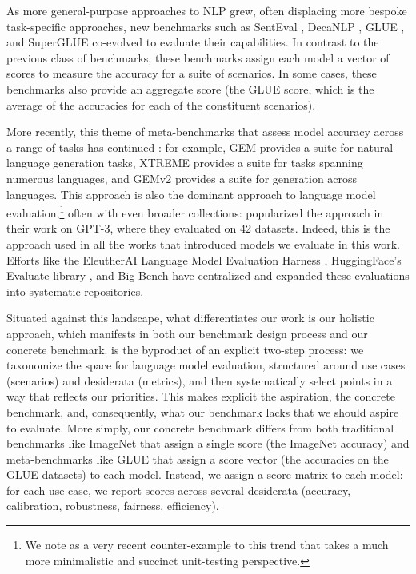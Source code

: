 As more general-purpose approaches to NLP grew, often displacing more bespoke task-specific approaches, new benchmarks such as SentEval \citep{conneau2018senteval}, DecaNLP \citep{mccann2018natural}, GLUE \citep{wang2019glue}, and SuperGLUE \citep{wang2019superglue} co-evolved to evaluate their capabilities.
In contrast to the previous class of benchmarks, these benchmarks assign each model a vector of scores to measure the accuracy for a suite of scenarios.
In some cases, these benchmarks also provide an aggregate score (\eg the GLUE score, which is the average of the accuracies for each of the constituent scenarios).

More recently, this theme of meta-benchmarks that assess model accuracy across a range of tasks has continued \citep[see][\S4.4.3]{bommasani2021opportunities}: for example, GEM \citep{gehrmann2021gem} provides a suite for natural language generation tasks, XTREME \citep{hu2020xtreme} provides a suite for tasks spanning numerous languages, and GEMv2 \citep{gehrmann2022gemv2} provides a suite for generation across languages. 
This approach is also the dominant approach to language model evaluation,\footnote{We note \citet{efrat2022lmentry} as a very recent counter-example to this trend that takes a much more minimalistic and succinct unit-testing perspective.}
 often with even broader collections: \citet{brown2020gpt3} popularized the approach in their work on GPT-3, where they evaluated on 42 datasets.
Indeed, this is the approach used in all the works that introduced models we evaluate in this work.
Efforts like the EleutherAI Language Model Evaluation Harness \citep{gao2021harness}, HuggingFace's Evaluate library \citep{werra2022evaluate}, and Big-Bench \citep{srivastava2022bigbench} have centralized and expanded these evaluations into systematic repositories.

Situated against this landscape, what differentiates our work is our holistic approach, which manifests in both our benchmark design process and our concrete benchmark.
\benchmarkname is the byproduct of an explicit two-step process: we taxonomize the space for language model evaluation, structured around use cases (scenarios) and desiderata (metrics), and then systematically select points in a way that reflects our priorities. 
This makes explicit the aspiration, the concrete benchmark, and, consequently, what our benchmark lacks that we should aspire to evaluate. 
More simply, our concrete benchmark differs from both traditional benchmarks like ImageNet that assign a single score (\ie the ImageNet accuracy) and meta-benchmarks like GLUE that assign a score vector (\ie the accuracies on the GLUE datasets) to each model.
Instead, we assign a score matrix to each model: for each use case, we report scores across several desiderata (\eg accuracy, calibration, robustness, fairness, efficiency). 

